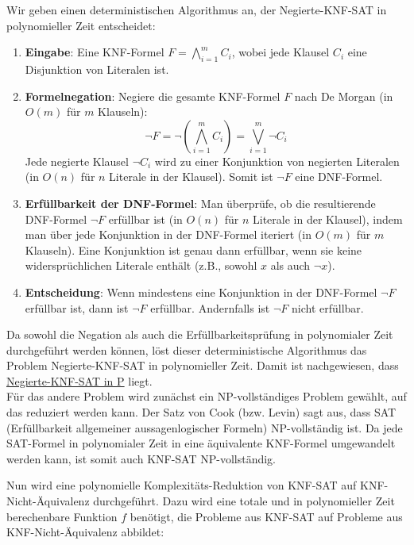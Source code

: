 Wir geben einen deterministischen Algorithmus an, der Negierte-KNF-SAT in polynomieller Zeit entscheidet:
\begin{enumerate}
    \item \textbf{Eingabe}: Eine KNF-Formel \( F = \bigwedge_{i=1}^m C_i \), wobei jede Klausel \( C_i \) eine Disjunktion von Literalen ist.
    
    \item \textbf{Formelnegation}: Negiere die gesamte KNF-Formel \( F \) nach De Morgan (in \( O(m) \) für \( m \) Klauseln):
	\[
	\neg F = \neg \left( \bigwedge_{i=1}^m C_i \right) = \bigvee_{i=1}^m \neg C_i
	\]
	Jede negierte Klausel \( \neg C_i \) wird zu einer Konjunktion von negierten Literalen (in \( O(n) \) für \( n \) Literale in der Klausel). Somit ist \( \neg F \) eine DNF-Formel.
    
    \item \textbf{Erfüllbarkeit der DNF-Formel}: Man überprüfe, ob die resultierende DNF-Formel \( \neg F \) erfüllbar ist (in \( O(n) \) für \( n \) Literale in der Klausel), indem man über jede Konjunktion in der DNF-Formel iteriert (in \( O(m) \) für \( m \) Klauseln). Eine Konjunktion ist genau dann erfüllbar, wenn sie keine widersprüchlichen Literale enthält (z.B., sowohl \( x \) als auch \( \neg x \)).
    
    \item \textbf{Entscheidung}: Wenn mindestens eine Konjunktion in der DNF-Formel \( \neg F \) erfüllbar ist, dann ist \( \neg F \) erfüllbar. Andernfalls ist \( \neg F \) nicht erfüllbar.
\end{enumerate}

Da sowohl die Negation als auch die Erfüllbarkeitsprüfung in polynomialer Zeit durchgeführt werden können, löst dieser deterministische Algorithmus das Problem Negierte-KNF-SAT in polynomieller Zeit. Damit ist nachgewiesen, dass \underline{Negierte-KNF-SAT in P} liegt.\\

Für das andere Problem wird zunächst ein NP-vollständiges Problem gewählt, auf das reduziert werden kann. Der Satz von Cook (bzw. Levin) sagt aus, dass SAT (Erfüllbarkeit allgemeiner aussagenlogischer Formeln) NP-vollständig ist. Da jede SAT-Formel in polynomialer Zeit in eine äquivalente KNF-Formel umgewandelt werden kann, ist somit auch KNF-SAT NP-vollständig.

Nun wird eine polynomielle Komplexitäts-Reduktion von KNF-SAT auf KNF-Nicht-Äquivalenz durchgeführt. Dazu wird eine totale und in polynomieller Zeit berechenbare Funktion $f$ benötigt, die Probleme aus KNF-SAT auf Probleme aus KNF-Nicht-Äquivalenz abbildet:

